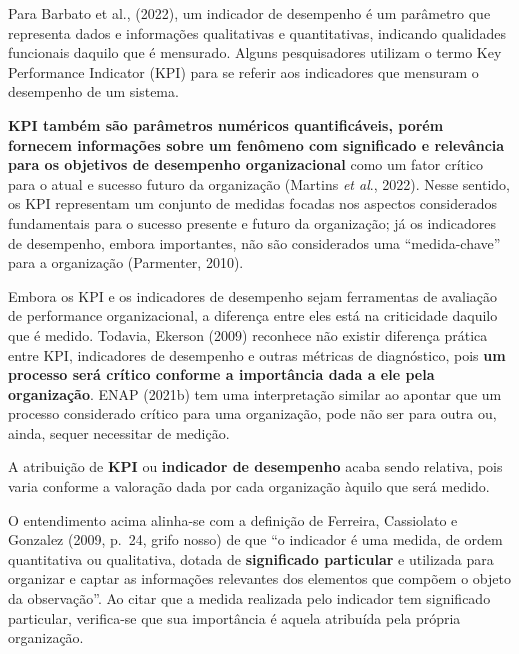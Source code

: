 \documentclass[
  letterpaper,
  DIV=11,
  numbers=noendperiod]{scrreprt}
\begin{document}
Para Barbato et al., (2022), um indicador de desempenho é um parâmetro
que representa dados e informações qualitativas e quantitativas,
indicando qualidades funcionais daquilo que é mensurado. Alguns
pesquisadores utilizam o termo Key Performance Indicator (KPI) para se
referir aos indicadores que mensuram o desempenho de um sistema.

\textbf{KPI também são parâmetros numéricos quantificáveis, porém
fornecem informações sobre um fenômeno com significado e relevância para
os objetivos de desempenho organizacional} como um fator crítico para o
atual e sucesso futuro da organização (Martins \emph{et al}., 2022).
Nesse sentido, os KPI representam um conjunto de medidas focadas nos
aspectos considerados fundamentais para o sucesso presente e futuro da
organização; já os indicadores de desempenho, embora importantes, não
são considerados uma ``medida-chave'' para a organização (Parmenter,
2010).

Embora os KPI e os indicadores de desempenho sejam ferramentas de
avaliação de performance organizacional, a diferença entre eles está na
criticidade daquilo que é medido. Todavia, Ekerson (2009) reconhece não
existir diferença prática entre KPI, indicadores de desempenho e outras
métricas de diagnóstico, pois \textbf{um processo será crítico conforme
a importância dada a ele pela organização}. ENAP (2021b) tem uma
interpretação similar ao apontar que um processo considerado crítico
para uma organização, pode não ser para outra ou, ainda, sequer
necessitar de medição.

\begin{tcolorbox}[enhanced jigsaw, title=\textcolor{quarto-callout-note-color}{\faInfo}\hspace{0.5em}{Nota}, bottomrule=.15mm, arc=.35mm, bottomtitle=1mm, toprule=.15mm, coltitle=black, opacityback=0, colback=white, rightrule=.15mm, breakable, toptitle=1mm, leftrule=.75mm, titlerule=0mm, opacitybacktitle=0.6, colbacktitle=quarto-callout-note-color!10!white, left=2mm, colframe=quarto-callout-note-color-frame]

A atribuição de \textbf{KPI} ou \textbf{indicador de desempenho} acaba
sendo relativa, pois varia conforme a valoração dada por cada
organização àquilo que será medido.

\end{tcolorbox}

O entendimento acima alinha-se com a definição de Ferreira, Cassiolato e
Gonzalez (2009, p.~24, grifo nosso) de que ``o indicador é uma medida,
de ordem quantitativa ou qualitativa, dotada de \textbf{significado
particular} e utilizada para organizar e captar as informações
relevantes dos elementos que compõem o objeto da observação''. Ao citar
que a medida realizada pelo indicador tem significado particular,
verifica-se que sua importância é aquela atribuída pela própria
organização.
\end{document}
